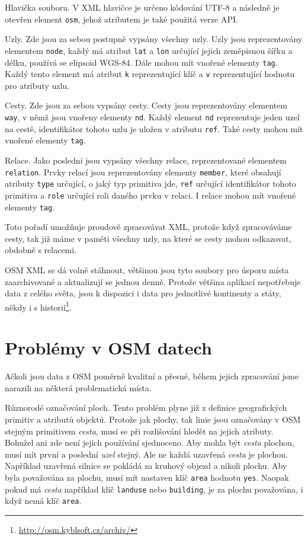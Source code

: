 {\tuc Hlavička souboru.} V XML hlavičce je určeno kódování UTF-8 a následně je
otevřen element \verb|osm|, jehož atributem je také použitá verze API. 

{\tuc Uzly.} Zde jsou za sebou postupně vypsány všechny uzly. Uzly jsou
reprezentovány elementem \verb|node|, každý má atribut \verb|lat| a \verb|lon|
určující jejich zeměpisnou šířku a délku, používá se elipsoid WGS-84. Dále mohou
mít vnořené elementy \verb|tag|. Každý tento element má atribut \verb|k|
reprezentující klíč a \verb|v| reprezentující hodnotu pro atributy uzlu.

{\tuc Cesty.} Zde jsou za sebou vypsány cesty. Cesty jsou reprezentovány
elementem \verb|way|, v němž jsou vnořeny elementy \verb|nd|. Každý element
\verb|nd| reprezentuje jeden uzel na cestě, identifikátor tohoto uzlu je uložen
v atributu \verb|ref|. Také cesty mohou mít vnořené elementy \verb|tag|.

{\tuc Relace.} Jako poslední jsou vypsány všechny relace, reprezentované
elementem \verb|relation|. Prvky relací jsou reprezentovány elementy
\verb|member|, které obsahují atributy \verb|type| určující, o jaký typ
primitiva jde, \verb|ref| určující identifikátor tohoto primitiva a \verb|role|
určující roli daného prvku v relaci. I relace mohou mít vnořené elementy
\verb|tag|.

Toto pořadí umožňuje proudově zpracovávat XML, protože když zpracováváme cesty,
tak již máme v paměti všechny uzly, na které se cesty mohou odkazovat, obdobně
s relacemi. 

OSM XML se dá volně stáhnout, většinou jsou tyto soubory pro úsporu místa
zaarchivované a aktualizují se jednou denně. Protože většina aplikací
nepotřebuje data z celého světa, jsou k dispozici i data pro jednotlivé
kontinenty a státy, někdy i s
historií\footnote{\url{http://osm.kyblsoft.cz/archiv/}}. 

\section{Problémy v OSM datech}
Ačkoli jsou data z OSM poměrně kvalitní a přesné, během jejich zpracování jsme
narazili na některá problematická místa. 

Různorodé označování ploch. Tento problém plyne již z definice geografických
primitiv a atributů objektů. Protože jak plochy, tak linie jsou označovány v OSM
stejným primitivem {\em cesta}, musí se při rozlišování hledět na jejich atributy.
Bohužel ani zde není jejich používání sjednoceno. Aby mohla být {\em cesta}
plochou, musí mít první a poslední {\em uzel} stejný. Ale ne každá uzavřená {\em
cesta } je plochou. Například uzavřená silnice se pokládá za kruhový objezd a
nikoli plochu. Aby byla považována za plochu, musí mít nastaven klíč
\verb|area| hodnotu \verb|yes|. Naopak pokud má {\em cesta} například klíč \verb|landuse|
nebo \verb|building|, je za plochu považována, i když nemá klíč \verb|area|.


